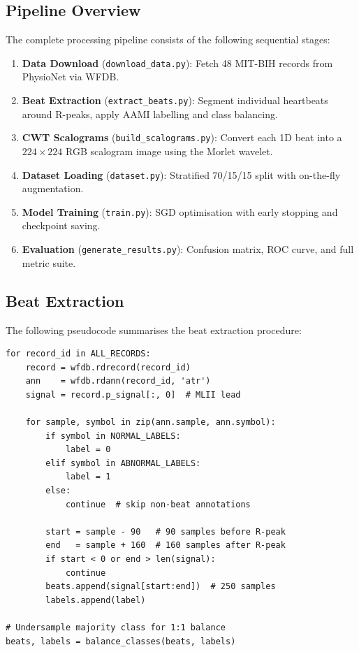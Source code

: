\documentclass[12pt,a4paper]{article}
\begin{document}
\subsection{Pipeline Overview}

The complete processing pipeline consists of the following sequential stages:

\begin{enumerate}[leftmargin=*]
    \item \textbf{Data Download} (\texttt{download\_data.py}): Fetch 48 MIT-BIH records from PhysioNet via WFDB.
    \item \textbf{Beat Extraction} (\texttt{extract\_beats.py}): Segment individual heartbeats around R-peaks, apply AAMI labelling and class balancing.
    \item \textbf{CWT Scalograms} (\texttt{build\_scalograms.py}): Convert each 1D beat into a $224 \times 224$ RGB scalogram image using the Morlet wavelet.
    \item \textbf{Dataset Loading} (\texttt{dataset.py}): Stratified 70/15/15 split with on-the-fly augmentation.
    \item \textbf{Model Training} (\texttt{train.py}): SGD optimisation with early stopping and checkpoint saving.
    \item \textbf{Evaluation} (\texttt{generate\_results.py}): Confusion matrix, ROC curve, and full metric suite.
\end{enumerate}

\subsection{Beat Extraction}

The following pseudocode summarises the beat extraction procedure:

\begin{lstlisting}[caption={Beat extraction from MIT-BIH records.},label=alg:beat]
for record_id in ALL_RECORDS:
    record = wfdb.rdrecord(record_id)
    ann    = wfdb.rdann(record_id, 'atr')
    signal = record.p_signal[:, 0]  # MLII lead

    for sample, symbol in zip(ann.sample, ann.symbol):
        if symbol in NORMAL_LABELS:
            label = 0
        elif symbol in ABNORMAL_LABELS:
            label = 1
        else:
            continue  # skip non-beat annotations

        start = sample - 90   # 90 samples before R-peak
        end   = sample + 160  # 160 samples after R-peak
        if start < 0 or end > len(signal):
            continue
        beats.append(signal[start:end])  # 250 samples
        labels.append(label)

# Undersample majority class for 1:1 balance
beats, labels = balance_classes(beats, labels)
\end{lstlisting}
\end{document}

